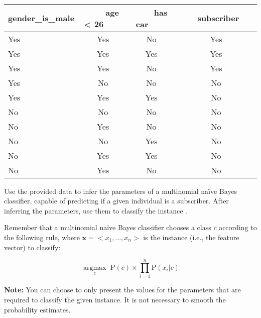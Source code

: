 \documentclass[12pt]{article}
\begin{document}
\begin{center}
\scriptsize
\tt
\begin{tabular}{ l c c c }
gender\_is\_male & ~~~~age < 26~~~~ & ~~~~has car~~~~ & ~~~~{\bf subscriber}~~~ \\
\hline
\hline
Yes    & Yes                & No                & Yes \\ \hline
Yes    & Yes                & Yes               & Yes \\ \hline
Yes    & Yes                & No                & Yes \\ \hline
Yes    & No                 & No                & No  \\ \hline
Yes    & Yes                & Yes               & No  \\ \hline
No     & No                 & No                & No  \\ \hline
No     & Yes                & No                & No  \\ \hline
No     & No                 & Yes               & No  \\ \hline
No     & Yes                & Yes               & No  \\ \hline
No     & Yes                & No                & No  \\ \hline
\end{tabular}
\end{center}

Use the provided data to infer the parameters of a multinomial naïve Bayes classifier, capable of predicting if a given individual is a subscriber. After inferring the parameters, use them to classify the instance {\tt <Yes, No, Yes>}.

Remember that a multinomial naïve Bayes classifier chooses a class $c$ according to the following rule, where $\mathbf{x}=<x_1,\ldots,x_n>$ is the instance (i.e., the feature vector) to classify:

\begin{equation*}
\underset{c}{\operatorname{argmax}} \text{~} \mathrm{P}(c) \times  \displaystyle\prod_{i=1}^n \mathrm{P}(x_i \vert c)
\end{equation*}

{\bf Note:} You can choose to only present the values for the parameters that are required to classify the given instance. It is not necessary to smooth the probability estimates. 
\end{document}
